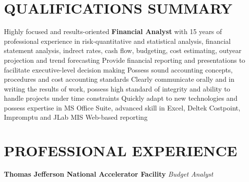 \documentclass[11pt, letterpaper]{moderncv}
\title{}
\begin{document}

\maketitle
\vspace{1cm}

\section{QUALIFICATIONS SUMMARY }
\cvitem{}    {}
\cvitem{}    {Highly focused and results-oriented \textbf{Financial Analyst} with 15 years of professional
              experience in risk-quantitative and statistical analysis, financial statement analysis,
              indrect rates, cash flow, budgeting, cost estimating, outyear projection
              and trend forecasting}
\cvitem{}    { Provide financial reporting and presentations to facilitate
                         executive-level decision making }
\cvitem{}    { Possess sound accounting concepts, procedures and cost accounting standards }
\cvitem{}    { Clearly communicate orally and in writing the results of work, possess
                         high standard of integrity and ability to handle projects under
                         time constraints }
\cvitem{}    { Quickly adapt to new technologies and possess expertise in MS Office Suite,
                         advanced skill in Excel, Deltek Costpoint, Impromptu and JLab MIS Web-based reporting }
\cvitem{}    {}
\cvitem{}    {}


\section{PROFESSIONAL EXPERIENCE}
\cvitem{}    {}
     {\textbf{Thomas Jefferson National Accelerator Facility } }
 {\textit{Budget Analyst} }
\end{document}
